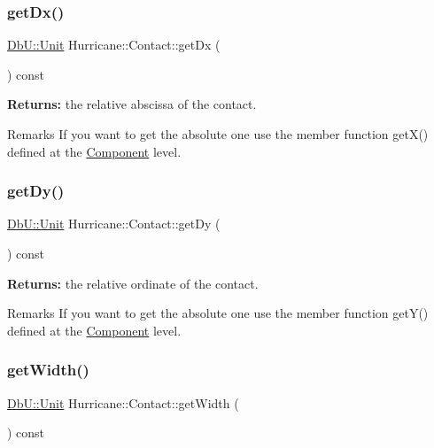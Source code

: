 \subsubsection{\texorpdfstring{get\+Dx()}{getDx()}}
{\footnotesize\ttfamily \mbox{\hyperlink{group__DbUGroup_ga4fbfa3e8c89347af76c9628ea06c4146}{Db\+U\+::\+Unit}} Hurricane\+::\+Contact\+::get\+Dx (\begin{DoxyParamCaption}{ }\end{DoxyParamCaption}) const\hspace{0.3cm}{\ttfamily [inline]}}

{\bfseries Returns\+:} the relative abscissa of the contact.

\begin{DoxyRemark}{Remarks}
If you want to get the absolute one use the member function get\+X() defined at the \mbox{\hyperlink{classHurricane_1_1Component}{Component}} level. 
\end{DoxyRemark}
\mbox{\label{classHurricane_1_1Contact_af674c59fcaf1f5214d54a558fe30e41a}} 
\subsubsection{\texorpdfstring{get\+Dy()}{getDy()}}
{\footnotesize\ttfamily \mbox{\hyperlink{group__DbUGroup_ga4fbfa3e8c89347af76c9628ea06c4146}{Db\+U\+::\+Unit}} Hurricane\+::\+Contact\+::get\+Dy (\begin{DoxyParamCaption}{ }\end{DoxyParamCaption}) const\hspace{0.3cm}{\ttfamily [inline]}}

{\bfseries Returns\+:} the relative ordinate of the contact.

\begin{DoxyRemark}{Remarks}
If you want to get the absolute one use the member function get\+Y() defined at the \mbox{\hyperlink{classHurricane_1_1Component}{Component}} level. 
\end{DoxyRemark}
\mbox{\label{classHurricane_1_1Contact_a794ce7c3aa5ffe894c1231f7c5ac3c52}} 
\subsubsection{\texorpdfstring{get\+Width()}{getWidth()}}
{\footnotesize\ttfamily \mbox{\hyperlink{group__DbUGroup_ga4fbfa3e8c89347af76c9628ea06c4146}{Db\+U\+::\+Unit}} Hurricane\+::\+Contact\+::get\+Width (\begin{DoxyParamCaption}{ }\end{DoxyParamCaption}) const\hspace{0.3cm}{\ttfamily [inline]}}

